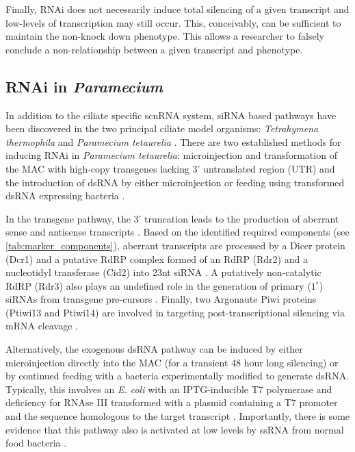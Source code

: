 Finally, RNAi does not necessarily induce total silencing
of a given transcript and low-levels of transcription may still occur.
This, conceivably, can be sufficient to maintain the non-knock down phenotype.
This allows a researcher to falsely conclude a non-relationship between
a given transcript and phenotype.

\subsection{RNAi in \textit{Paramecium}}

In addition to the ciliate specific scnRNA system, 
siRNA based pathways have been discovered in the two principal
ciliate model organisms: \textit{Tetrahymena thermophila} \citep{Collins2006,Yao2005}
and \textit{Paramecium tetaurelia} \citep{Galvani2001,Galvani2002}. 
There are two established methods for inducing RNAi in \textit{Paramecium tetaurelia}:
microinjection and transformation of the MAC with high-copy transgenes lacking 3' untranslated
region (UTR) \citep{Galvani2001} and the introduction of dsRNA by either
microinjection or feeding using transformed dsRNA expressing bacteria 
\citep{Galvani2002}.

In the transgene pathway, the 3' truncation leads to the production of aberrant
sense and antisense transcripts \citep{Galvani2001,Marker2010,Beisson2010b}.
Based on the identified required components (see \cref{tab:marker_components}), 
aberrant transcripts
are processed by a Dicer protein (Dcr1) \citep{Lepere2009} and
a putative RdRP complex formed of an RdRP (Rdr2) and a nucleotidyl
transferase (Cid2) \citep{Marker2014} into 23nt siRNA \citep{Lepere2009}. 
A putatively non-catalytic 
RdRP (Rdr3) also plays an undefined role in the generation
of primary (\(1^{\circ}\)) siRNAs from transgene pre-cursors \citep{Marker2010,Marker2014}.
Finally, two Argonaute Piwi proteins (Ptiwi13 and Ptiwi14) \citep{Bouhouche2011} 
are involved in targeting post-transcriptional silencing via mRNA
cleavage \citep{Bouhouche2011,Marker2014}.


Alternatively, the exogenous dsRNA pathway can be induced by either microinjection directly
into the MAC (for a transient 48 hour long silencing) or by continued feeding
with a bacteria experimentally modified to generate dsRNA.
Typically, this involves an \textit{E. coli} 
with an IPTG-inducible T7 polymerase and 
deficiency for RNAse III transformed with
a plasmid containing a T7 promoter and the sequence
homologous to the target transcript
\citep{Fire1998,Timmons2001,Galvani2002}.
Importantly, there is some evidence that this pathway also is activated at low
levels by ssRNA from normal food bacteria \citep{Carradec2015}.

